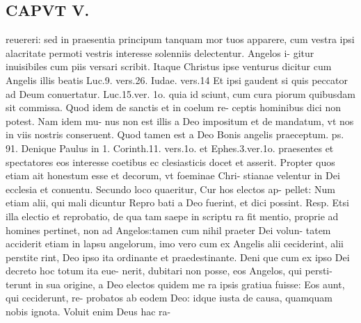 \documentclass{article}
\begin{document}
\begin{pages}
\section*{CAPVT  V. }
\marginpar{[ p.333 ]}\pstart reuereri: sed in praesentia principum tanquam mor tuos apparere, cum vestra ipsi alacritate permoti vestris interesse solenniis delectentur. Angelos i- gitur inuisibiles cum piis versari scribit. Itaque Christus ipse venturus dicitur cum Angelis illis beatis Luc.9. vers.26. Iudae. vers.14 Et ipsi gaudent si quis peccator ad Deum conuertatur. Luc.15.ver. 1o. quia id sciunt, cum cura piorum quibusdam sit commissa. Quod idem de sanctis et in coelum re- ceptis hominibus dici non potest. Nam idem mu- nus non est illis a Deo impositum et de mandatum, vt nos in viis nostris conseruent. Quod tamen est a Deo Bonis angelis praeceptum. ps. 91. Denique Paulus in 1. Corinth.11. vers.1o. et Ephes.3.ver.1o. praesentes et spectatores eos interesse coetibus ec clesiasticis docet et asserit. Propter quos etiam ait honestum esse et decorum, vt foeminae Chri- stianae velentur in Dei ecclesia et conuentu. Secundo loco quaeritur, Cur hos electos ap- pellet: Num etiam alii, qui mali dicuntur Repro bati a Deo fuerint, et dici possint. Resp. Etsi illa electio et reprobatio, de qua tam saepe in scriptu ra fit mentio, proprie ad homines pertinet, non ad Angelos:tamen cum nihil praeter Dei volun- tatem acciderit etiam in lapsu angelorum, imo vero cum ex Angelis alii ceciderint, alii perstite rint, Deo ipso ita ordinante et praedestinante. Deni que cum ex ipso Dei decreto hoc totum ita eue- nerit, dubitari non posse, eos Angelos, qui persti- terunt in sua origine, a Deo electos quidem me ra ipsis gratiua fuisse: Eos aunt, qui ceciderunt, re- probatos ab eodem Deo: idque iusta de causa, quamquam nobis ignota. Voluit enim Deus hac ra-  \pend

\end{pages}
\end{document}
